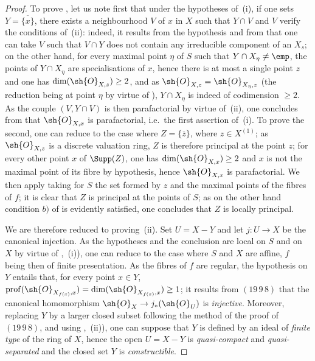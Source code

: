 \begin{proof}
To prove , let us note first that under the hypotheses of~(i), if one sets $Y=\overline{\{x\}}$, there exists a neighbourhood $V$ of $x$ in $X$ such that $Y\cap V$ and $V$ verify the conditions of~(ii): indeed, it results from the hypothesis and from  that one can take $V$ such that $V\cap Y$ does not contain any irreducible component of an $X_s$; on the other hand, for every maximal point $\eta$ of $S$ such that $Y\cap X_\eta\neq\emp$, the points of $Y\cap X_\eta$ are specialisations of $x$, hence there is at most a single point $z$ and one has $\dim(\sh{O}_{X,z})\geq 2$, and as $\sh{O}_{X,z}=\sh{O}_{X_\eta,z}$ (the reduction being at point $\eta$ by virtue of ), $Y\cap X_\eta$ is indeed of codimension $\geq 2$.
As the couple $(V,Y\cap V)$ is then parafactorial by virtue of~(ii), one concludes from  that $\sh{O}_{X,x}$ is parafactorial, i.e.\ the first assertion of~(i).
To prove the second, one can reduce to the case where $Z=\{\overline{z}\}$, where $z\in X^{(1)}$; as $\sh{O}_{X,z}$ is a discrete valuation ring, $Z$ is therefore principal at the point $z$; for every other point $x$ of $\Supp(Z)$, one has $\dim(\sh{O}_{X,x})\geq 2$ and $x$ is not the maximal point of its fibre by hypothesis, hence $\sh{O}_{X,x}$ is parafactorial.
We then apply  taking for $S$ the set formed by $z$ and the maximal points of the fibres of $f$; it is clear that $Z$ is principal at the points of $S$; as on the other hand condition $b)$ of  is evidently satisfied, one concludes that $Z$ is locally principal.

We are therefore reduced to proving~(ii).
Set $U=X-Y$ and let $j:U\to X$ be the canonical injection.
As the hypotheses and the conclusion are local on $S$ and on $X$ by virtue of ,~(i)), one can reduce to the case where $S$ and $X$ are affine, $f$ being then of finite presentation.
As the fibres of $f$ are regular, the hypothesis on $Y$ entails that, for every point $x\in Y$, $\operatorname{prof}(\sh{O}_{X_{f(x)},x})=\dim(\sh{O}_{X_{f(x)},x})\geq 1$; it results from $(19\,9\,8)$ that the canonical homomorphism $\sh{O}_X\to j_*(\sh{O}_U)$ is \emph{injective}.
Moreover, replacing $Y$ by a larger closed subset following the method of the proof of $(19\,9\,8)$, and using ,~(ii)), one can suppose that $Y$ is defined by an ideal of \emph{finite type} of the ring of $X$, hence the open $U=X-Y$ is \emph{quasi-compact} and \emph{quasi-separated} and the closed set $Y$ is \emph{constructible}.


\end{proof}
